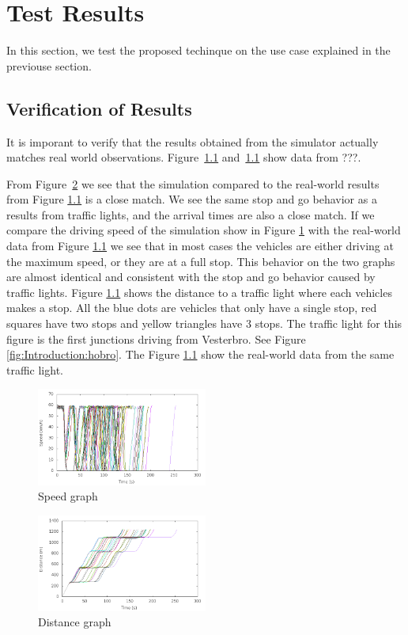 \section{Test Results}
In this section, we test the proposed techinque on the use case explained in the previouse section.

\subsection{Verification of Results}
It is imporant to verify that the results obtained from the simulator actually matches real world observations.
Figure~\ref{} and~\ref{} show data from ???.

From Figure~\ref{fig:TestResults:distance0} we see that the simulation compared to the real-world results from Figure \ref{} is a close match. 
We see the same stop and go behavior as a results from traffic lights, and the arrival times are also a close match. 
If we compare the driving speed of the simulation show in Figure \ref{fig:TestResults:speed0} with the real-world data from Figure \ref{} we see that in most cases the vehicles are either driving at the maximum speed, or they are at a full stop. 
This behavior on the two graphs are almost identical and consistent with the stop and go behavior caused by traffic lights. 
Figure \ref{} shows the distance to a traffic light where each vehicles makes a stop. 
All the blue dots are vehicles that only have a single stop, red squares have two stops and yellow triangles have 3 stops.
The traffic light for this figure is the first junctions driving from Vesterbro. See Figure \ref{fig:Introduction:hobro}. The Figure \ref{} show the real-world data from the same traffic light. 

\begin{figure}[htb]
\includegraphics[width=0.5\textwidth]{images/tp0/speedUncontrolled0.png}
\caption{Speed graph}
\label{fig:TestResults:speed0}
\end{figure}

\begin{figure}[htb]
\includegraphics[width=0.5\textwidth]{images/tp0/distanceUncontrolled0.png}
\caption{Distance graph}
\label{fig:TestResults:distance0}
\end{figure}

